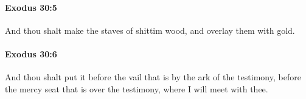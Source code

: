 		\paragraph{Exodus 30:5} %
			\label{EXODUS-30-5}

			And thou shalt make the staves of shittim wood, and overlay them with gold.


		\paragraph{Exodus 30:6} %
			\label{EXODUS-30-6}

			And thou shalt put it before the vail that is by the ark of the testimony, before the mercy seat that is over the testimony, where I will meet with thee.


